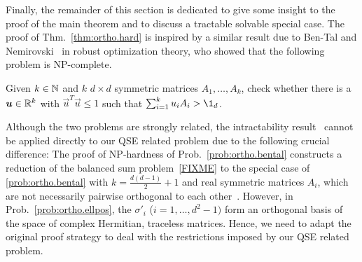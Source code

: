 Finally, the remainder of this section is dedicated to give some insight to the proof of the main theorem and to discuss a tractable solvable special case.
The proof of Thm.~\ref{thm:ortho.hard} is inspired by a similar result due to Ben-Tal and Nemirovski~\cite{Tal_1998_Robust} in robust optimization theory, who showed that the following problem is NP-complete.
\begin{problem}
  \label{prob:ortho.bental}
  Given $k \in \mathbb{N}$ and $k$ $d\times d$ symmetric matrices $A_{1},\ldots,A_{k}$, check whether there is a $\boldsymbol{u} \in \mathbb{R}^k$ with $\vec{u}^{T}\vec{u} \leq 1$ such that $\sum_{i=1}^{k}u_{i}A_{i} > \1_{d}$.
\end{problem}
Although the two problems are strongly related, the intractability result~\cite{Tal_1998_Robust} cannot be applied directly to our QSE related problem due to the following crucial difference:
The proof of NP-hardness of Prob.~\ref{prob:ortho.bental} constructs a reduction of the balanced sum problem~\eqref{FIXME} to the special case of \cref{prob:ortho.bental} with $k=\frac{d(d-1)}{2} + 1$ and real symmetric matrices $A_i$, which are not necessarily pairwise orthogonal to each other~\cite[Sec.~3.4.1]{Tal_1998_Robust}.
However, in Prob.~\ref{prob:ortho.ellpos}, the $\sigma'_i$ ($i=1,\ldots,d^2 - 1)$ form an orthogonal basis of the space of complex Hermitian, traceless matrices.
Hence, we need to adapt the original proof strategy to deal with the restrictions imposed by our QSE related problem.

